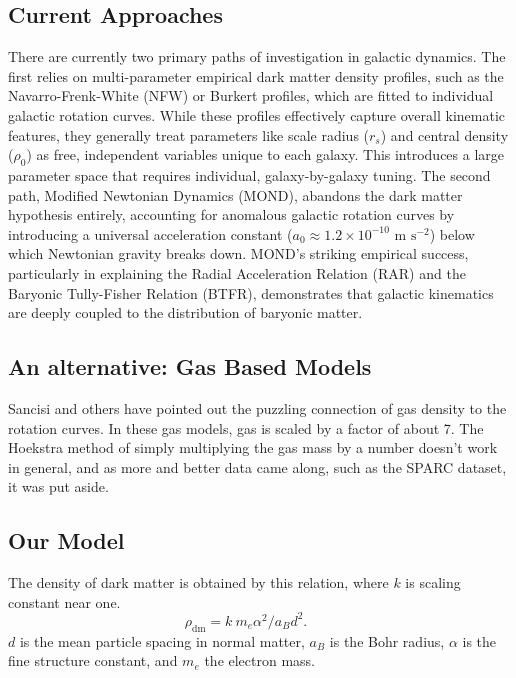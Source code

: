 \documentclass[fleqn,usenatbib]{mnras}
\begin{document}
\subsection{Current Approaches} \label{subsec:current}
There are currently two primary paths of investigation in galactic dynamics. The first relies on multi-parameter empirical dark matter density profiles, such as the Navarro-Frenk-White (NFW)\citep{navarroUniversalDensityProfile1997} or Burkert profiles\citep{burkertStructureDarkMatter1995}, which are fitted to individual galactic rotation curves. While these profiles effectively capture overall kinematic features, they generally treat parameters like scale radius ($r_s$) and central density ($\rho_0$) as free, independent variables unique to each galaxy. This introduces a large parameter space that requires individual, galaxy-by-galaxy tuning. The second path, Modified Newtonian Dynamics (MOND), abandons the dark matter hypothesis entirely, accounting for anomalous galactic rotation curves by introducing a universal acceleration constant ($a_0 \approx 1.2 \times 10^{-10} \text{ m s}^{-2}$) below which Newtonian gravity breaks down. MOND's striking empirical success, particularly in explaining the Radial Acceleration Relation (RAR) and the Baryonic Tully-Fisher Relation (BTFR)\citep{Lelli2017}, demonstrates that galactic kinematics are deeply coupled to the distribution of baryonic matter. 

\subsection{An alternative: Gas Based Models}
Sancisi and others have pointed out the puzzling connection of gas density to the rotation curves. In these gas models, gas is scaled by a factor of about  7\citep{hoekstraApparentCouplingNeutral2001}. The Hoekstra method of simply multiplying the gas mass by a number  doesn't work in general, and as more and better data came along, such as the SPARC dataset, it was put aside.

\subsection{Our Model} \label{subsec:ourmodel}

The density of dark matter is obtained by this relation, where $k$ is scaling constant near one. 
\begin{equation} \label{mainEquation}
    \rho_{\text{dm}} =k\  m_e \alpha^2 / a_B d^2.
    \qquad
\end{equation}
$d$ is the mean particle spacing in normal matter, $a_B$ is the Bohr radius, $\alpha$ is the fine structure constant, and $m_e$ the electron mass. 
\end{document}
